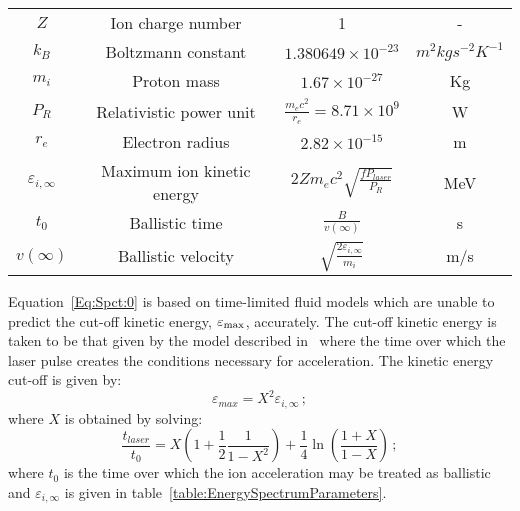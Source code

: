 \begin{table}
\begin{center}
\begin{tabular}{c c c c}
      $Z$ & Ion charge number & 1 & - \\  
      $k_{B}$ & Boltzmann constant & $1.380649 \times 10^{-23}$ & $m^{2} kg s^{-2} K^{-1}$ \\  
      $m_{i}$ & Proton mass & $1.67 \times 10^{-27}$ & Kg \\ 
      $P_{R}$ & Relativistic power unit & $\frac{m_{e} c^{2}}{r_{e}} = 8.71 \times 10^{9}$ & W \\  
      $r_{e}$ & Electron radius & $2.82 \times 10^{-15}$ & m \\  
      $\varepsilon_{i,\infty}$ & Maximum ion kinetic energy & $2 Z m_{e} c^{2} \sqrt{\frac{f P_{laser}}{P_{R}}}$ & MeV \\  
      $t_{0}$ & Ballistic time & $\frac{B}{v(\infty)}$ & s \\  
      $v(\infty)$ & Ballistic velocity & $\sqrt{\frac{2 \varepsilon_{i,\infty}}{m_{i}}}$ & m/s \\  
      \hline
    \end{tabular}
  \end{center}
\end{table}

Equation~\ref{Eq:Spct:0} is based on time-limited fluid models which
are unable to predict the cut-off kinetic energy, $\varepsilon_{\rm max}$,
accurately.
The cut-off kinetic energy is taken to be that given by the model
described in~\cite{10.1103/PhysRevLett.97.045005} where the time over
which the laser pulse creates the conditions necessary for
acceleration. 
The kinetic energy cut-off is given by:
\begin{equation}
  \varepsilon_{max} = X^{2} \varepsilon_{i,\infty} \, ;
  \label{eq:Eq:Spct:2}
\end{equation}
where $X$ is obtained by solving:
\begin{equation}
  \frac{t_{laser}}{t_{0}} = X \left( 1 + \frac{1}{2}
                           \frac{1}{1 - X^{2}} \right) +
                           \frac{1}{4} \ln \left( \frac{1+X}{1-X} \right) \, ;
  \label{eq:Eq:Spct:1}
\end{equation}
where $t_0$ is the time over which the ion acceleration may be treated
as ballistic and $\varepsilon_{i,\infty}$ is given in
table~\ref{table:EnergySpectrumParameters}.

